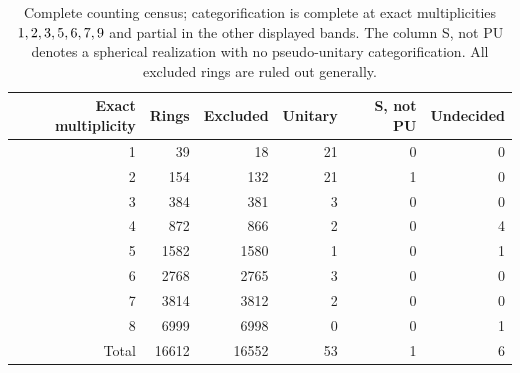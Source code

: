 \begin{table}[ht]\centering\small
\begin{tabular}{rrrrrr}\toprule
Exact multiplicity & Rings & Excluded & Unitary & S, not PU & Undecided\\\midrule
1 & 39 & 18 & 21 & 0 & 0\\
2 & 154 & 132 & 21 & 1 & 0\\
3 & 384 & 381 & 3 & 0 & 0\\
4 & 872 & 866 & 2 & 0 & 4\\
5 & 1582 & 1580 & 1 & 0 & 1\\
6 & 2768 & 2765 & 3 & 0 & 0\\
7 & 3814 & 3812 & 2 & 0 & 0\\
8 & 6999 & 6998 & 0 & 0 & 1\\
\midrule
Total & 16612 & 16552 & 53 & 1 & 6\\
\bottomrule\end{tabular}
\caption{Complete counting census; categorification is complete at exact multiplicities $1, 2, 3, 5, 6, 7, 9$ and partial in the other displayed bands. The column S, not PU denotes a spherical realization with no pseudo-unitary categorification. All excluded rings are ruled out generally.}\label{tab:classification}
\end{table}
